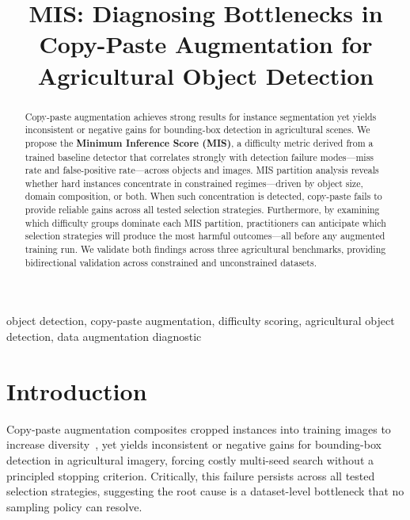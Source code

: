 \documentclass[conference]{IEEEtran}
\begin{document}
\title{MIS: Diagnosing Bottlenecks in Copy-Paste Augmentation
for Agricultural Object Detection}

\author{
}

\maketitle

\begin{abstract}
Copy-paste augmentation achieves strong results for instance
segmentation yet yields inconsistent or negative gains for
bounding-box detection in agricultural scenes.
We propose the \textbf{Minimum Inference Score (MIS)}, a
difficulty metric derived from a trained baseline detector
that correlates strongly with detection failure modes---miss
rate and false-positive rate---across objects and images.
MIS partition analysis reveals whether hard instances
concentrate in constrained regimes---driven by object
size, domain composition, or both.
When such concentration is detected, copy-paste fails
to provide reliable gains across all tested selection
strategies.
Furthermore, by examining which difficulty groups dominate
each MIS partition, practitioners can anticipate which
selection strategies will produce the most harmful
outcomes---all before any augmented training run.
We validate both findings across three agricultural
benchmarks, providing bidirectional validation across
constrained and unconstrained datasets.
\end{abstract}

\begin{IEEEkeywords}
object detection, copy-paste augmentation, difficulty scoring,
agricultural object detection, data augmentation diagnostic
\end{IEEEkeywords}

\section{Introduction}
Copy-paste augmentation composites cropped instances into
training images to increase diversity~\cite{kisantal2019augmentation,
ghiasi2021simple}, yet yields inconsistent or negative gains
for bounding-box detection in agricultural imagery, forcing costly multi-seed search
without a principled stopping criterion.
Critically, this failure persists across all tested selection
strategies, suggesting the root cause is a dataset-level
bottleneck that no sampling policy can resolve.
\end{document}
